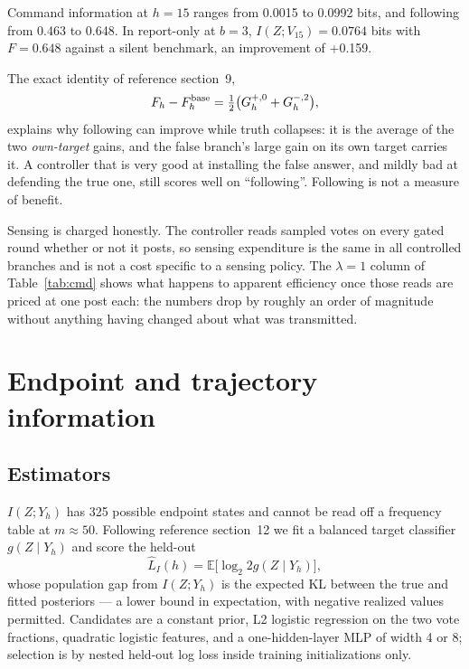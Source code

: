 \documentclass[11pt]{article}
\begin{document}
Command information at $h=15$ ranges from 0.0015 to 0.0992 bits, and
following from 0.463 to 0.648. In report-only at $b=3$, $I(Z;V_{15})=
0.0764$ bits with $F=0.648$ against a silent benchmark, an improvement of
+0.159.

The exact identity of reference section~9,
\begin{equation}
F_h-F^{\rm base}_h=\tfrac12\big(G^{+,0}_h+G^{-,2}_h\big),
\end{equation}
explains why following can improve while truth collapses: it is the average of the two
\emph{own-target} gains, and the false branch's large gain on its own target carries it.
A controller that is very good at installing the false answer, and mildly bad at defending
the true one, still scores well on ``following''. Following is not a measure of benefit.

Sensing is charged honestly. The controller reads sampled votes on every gated round whether
or not it posts, so sensing expenditure is the same in all controlled branches and is not a
cost specific to a sensing policy. The $\lambda=1$ column of Table~\ref{tab:cmd} shows what
happens to apparent efficiency once those reads are priced at one post each: the numbers
drop by roughly an order of magnitude without anything having changed about what was
transmitted.

\section{Endpoint and trajectory information}
\subsection{Estimators}
$I(Z;Y_h)$ has 325 possible endpoint states and cannot be read off a frequency table at
$m\approx50$. Following reference section~12 we fit a balanced target classifier
$g(Z\mid Y_h)$ and score the held-out
\begin{equation}
\widehat L_I(h)=\mathbb E\big[\log_2 2g(Z\mid Y_h)\big],
\end{equation}
whose population gap from $I(Z;Y_h)$ is the expected KL between the true and fitted
posteriors --- a lower bound in expectation, with negative realized values permitted.
Candidates are a constant prior, L2 logistic regression on the two vote fractions, quadratic
logistic features, and a one-hidden-layer MLP of width 4 or 8; selection is by nested
held-out log loss inside training initializations only.
\end{document}
